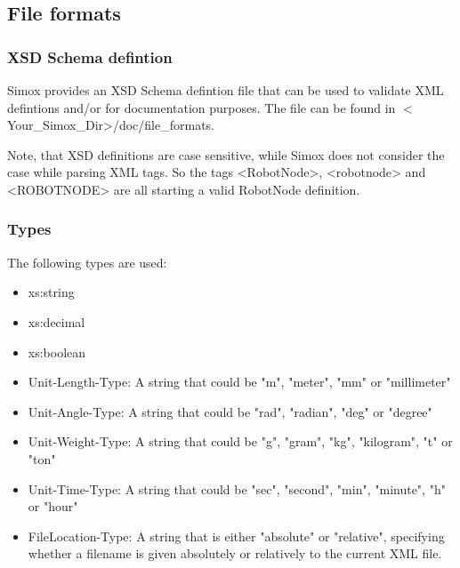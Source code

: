 \subsection{File formats}
\subsubsection{XSD Schema defintion}
Simox provides an XSD Schema defintion file that can be used to validate XML defintions and/or for documentation purposes. The file can be found in $<$Your\_Simox\_Dir>/doc/file\_formats.
\par
Note, that XSD definitions are case sensitive, while Simox does not consider the case while parsing XML tags. So the tags <RobotNode>, <robotnode> and <ROBOTNODE> are all starting a valid RobotNode definition. 
\subsubsection*{Types}
The following types are used: 
\begin{itemize}
\item xs:string 
\item xs:decimal
\item xs:boolean 
\item Unit-Length-Type: A string that could be "m", "meter", "mm" or "millimeter"
\item Unit-Angle-Type: A string that could be "rad", "radian", "deg" or "degree"
\item Unit-Weight-Type: A string that could be "g", "gram", "kg", "kilogram", "t" or "ton"
\item Unit-Time-Type: A string that could be "sec", "second", "min", "minute", "h" or "hour"
\item FileLocation-Type: A string that is either "absolute" or "relative", specifying whether a filename is given absolutely or relatively to the current XML file. 
\end{itemize}
